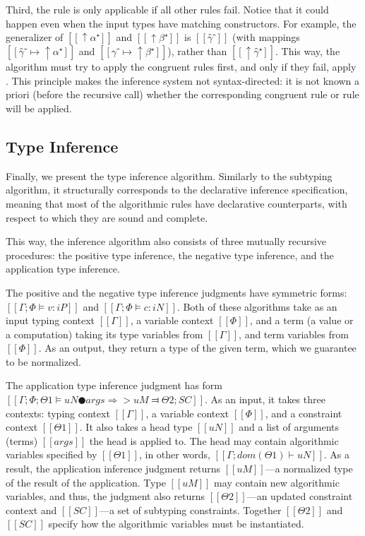   Third, the rule is only applicable if all other rules fail. 
  Notice that it could happen even when the input types have matching constructors. 
  For example, the generalizer of $[[↑α⁺]]$ and
  $[[↑β⁺]]$ is $[[γ̂⁻]]$ (with mappings $[[γ̂⁻ ↦ ↑α⁺]]$ and $[[γ̂⁻ ↦ ↑β⁺]]$),
  rather than $[[↑γ̂⁺]]$. This way, the algorithm must try to 
  apply the congruent rules first, and only if they fail,
  apply .
  This principle makes the inference system not syntax-directed:
  it is not known a priori (before the recursive call) 
  whether the corresponding congruent rule or rule  
  will be applied.

\subsection{Type Inference}

Finally, we present the type inference algorithm. 
Similarly to the subtyping algorithm, it structurally corresponds to the declarative
inference specification, meaning that most of the algorithmic rules have
declarative counterparts, with respect to which they are sound and complete.

This way, the inference algorithm also consists of three mutually recursive procedures: 
the positive type inference, the negative type inference, and the
application type inference. 

The positive and the negative type inference judgments have symmetric forms:
$[[Γ; Φ ⊨ v : iP]]$ and $[[Γ; Φ ⊨ c : iN]]$. Both of these algorithms
take as an input typing context $[[Γ]]$, a variable context $[[Φ]]$, and 
a term (a value or a computation) taking its type variables from $[[Γ]]$, 
and term variables from $[[Φ]]$. As an output, they return a type
of the given term, which we guarantee to be normalized. 

The application type inference judgment has form 
$[[Γ ; Φ ; Θ1 ⊨ uN ● args ⇒> uM ⫤ Θ2 ; SC]]$.
As an input, it takes three contexts: typing context $[[Γ]]$, a variable context $[[Φ]]$,
and a constraint context $[[Θ1]]$. It also takes a head type $[[uN]]$ and 
a list of arguments (terms) $[[args]]$ the head is applied to.
The head may contain algorithmic variables specified by $[[Θ1]]$, 
in other words, $[[Γ; dom(Θ1) ⊢ uN]]$.
As a result, the application inference judgment returns 
$[[uM]]$---a normalized type of the result of the application.
Type $[[uM]]$ may contain new algorithmic variables, and thus, 
the judgment also returns $[[Θ2]]$---an updated constraint context
and $[[SC]]$---a set of subtyping constraints.
Together $[[Θ2]]$  and $[[SC]]$ specify how the algorithmic variables 
must be instantiated.


